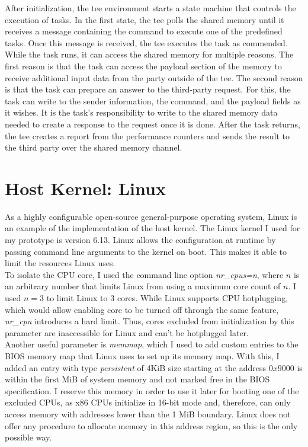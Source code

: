 After initialization, the \gls{tee} environment starts a state machine that
controls the execution of tasks. In the first state, the \gls{tee} polls the
shared memory until it receives a message containing the command to execute one
of the predefined tasks. Once this message is received, the \gls{tee} executes
the task as commended. While the task runs, it can access the shared memory for
multiple reasons. The first reason is that the task can access the payload
section of the memory to receive additional input data from the party outside of
the \gls{tee}. The second reason is that the task can prepare an answer to the
third-party request. For this, the task can write to the sender information, the
command, and the payload fields as it wishes. It is the task's responsibility to
write to the shared memory data needed to create a response to the request once
it is done. After the task returns, the \gls{tee} creates a report from the
performance counters and sends the result to the third party over the shared
memory channel. \\

\section{Host Kernel: Linux}
\label{sec:implementation:hostKernel}

As a highly configurable open-source general-purpose operating system, Linux is
an example of the implementation of the host kernel. The Linux kernel I used for
my prototype is version 6.13. Linux allows the configuration at runtime by
passing command line arguments to the kernel on boot. This makes it able to
limit the resources Linux uses. \\

To isolate the CPU core, I used the command line option \textit{nr\_cpus=n},
where $n$ is an arbitrary number that limits Linux from using a maximum core
count of $n$. I used $n=3$ to limit Linux to 3 cores. While Linux supports CPU
hotplugging, which would allow enabling core to be turned off through
the same feature, \textit{nr\_cpu} introduces a hard limit. Thus, cores excluded
from initialization by this parameter are inaccessible for Linux and can't be
hotplugged later. \\

Another useful parameter is \textit{memmap}, which I used to add custom entries
to the BIOS memory map that Linux uses to set up its memory map. With this, I
added an entry with type \textit{persistent} of 4KiB size starting at the
address $0x9000$ is within the first MiB of system memory and not marked free in
the BIOS specification. I reserve this memory in order to use it
later for booting one of the excluded CPUs, as x86 CPUs initialize in 16-bit
mode and, therefore, can only access memory with addresses lower than the 1 MiB
boundary. Linux does not offer any procedure to allocate memory in this address
region, so this is the only possible way. \\


